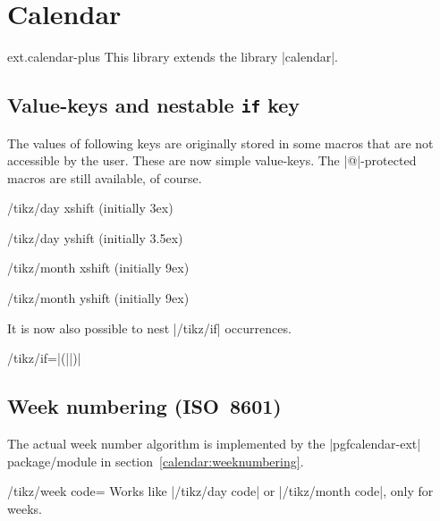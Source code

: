 %
%
%

\section{Calendar}
\begin{tikzlibrary}{ext.calendar-plus}
  This library extends the \tikzname\space library |calendar|.
\end{tikzlibrary}

\begin{multicols}{2}

\subsection{Value-keys and nestable \texttt{if} key}

The values of following keys are originally stored in some macros that are not
accessible by the user. These are now simple value-keys.
The |@|-protected macros are still available, of course.

\begin{key}{/tikz/day xshift (initially 3ex)}
\end{key}
\begin{key}{/tikz/day yshift (initially 3.5ex)}
\end{key}
\begin{key}{/tikz/month xshift (initially 9ex)}
\end{key}
\begin{key}{/tikz/month yshift (initially 9ex)}
\end{key}

It is now also possible to nest |/tikz/if| occurrences.
\begin{key}{/tikz/if=|(||)|}
\end{key}

\subsection{Week numbering (ISO~8601)}

The actual week number algorithm is implemented by the |pgfcalendar-ext| package/module in section~\ref{calendar:weeknumbering}.
\begin{key}{/tikz/week code=}
  Works like |/tikz/day code| or |/tikz/month code|, only for weeks.
\end{key}


\end{multicols}
